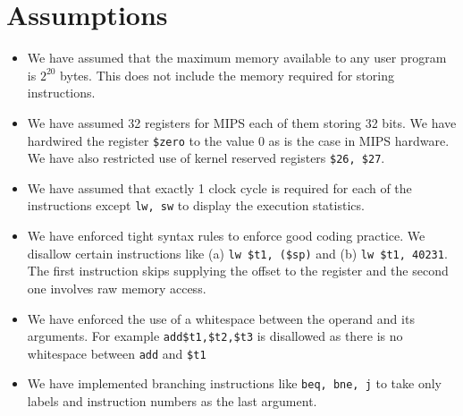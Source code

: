 \documentclass[hidelinks,12pt]{article}
\begin{document}
\section{Assumptions}
\begin{itemize}
    \item We have assumed that the maximum memory available to any user program is $2^{20}$ bytes. This does not include the memory required for storing instructions.
    \item We have assumed 32 registers for MIPS each of them storing 32 bits. We have hardwired the register \verb|$zero| to the value $0$ as is the case in MIPS hardware. We have also restricted use of kernel reserved registers \verb|$26, $27|.
    \item We have assumed that exactly 1 clock cycle is required for each of the instructions except \verb|lw, sw| to display the execution statistics.
    \item We have enforced tight syntax rules to enforce good coding practice. We disallow certain instructions like (a) \verb|lw $t1, ($sp)| and (b) \verb|lw $t1, 40231|.
          The first instruction skips supplying the offset to the register and the second one involves raw memory access.
    \item We have enforced the use of a whitespace between the operand and its arguments. For example \verb|add$t1,$t2,$t3| is disallowed as there is no whitespace between \verb|add| and \verb|$t1|
    \item We have implemented branching instructions like \verb|beq, bne, j| to take only labels and instruction numbers as the last argument.
\end{itemize}
\end{document}
